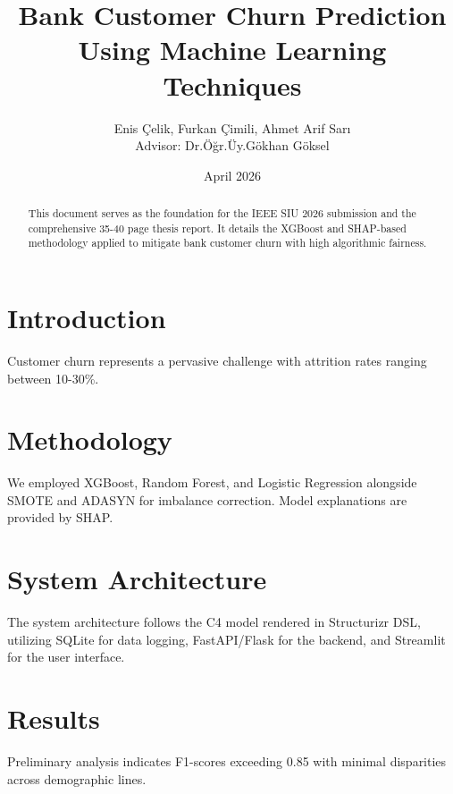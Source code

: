 \documentclass[12pt,a4paper]{article}
\title{Bank Customer Churn Prediction Using Machine Learning Techniques}
\author{Enis Çelik, Furkan Çimili, Ahmet Arif Sarı \\ Advisor: Dr.Öğr.Üy.Gökhan Göksel}
\date{April 2026}
\begin{document}
\maketitle
\begin{abstract}
This document serves as the foundation for the IEEE SIU 2026 submission and the comprehensive 35-40 page thesis report. It details the XGBoost and SHAP-based methodology applied to mitigate bank customer churn with high algorithmic fairness.
\end{abstract}

\section{Introduction}
Customer churn represents a pervasive challenge with attrition rates ranging between 10-30\%.

\section{Methodology}
We employed XGBoost, Random Forest, and Logistic Regression alongside SMOTE and ADASYN for imbalance correction. Model explanations are provided by SHAP.

\section{System Architecture}
The system architecture follows the C4 model rendered in Structurizr DSL, utilizing SQLite for data logging, FastAPI/Flask for the backend, and Streamlit for the user interface.

\section{Results}
Preliminary analysis indicates F1-scores exceeding 0.85 with minimal disparities across demographic lines.



\end{document}
